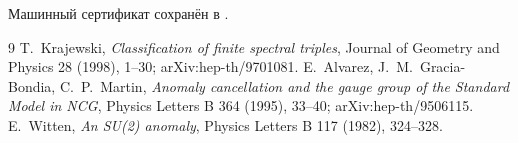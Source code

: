 Машинный сертификат сохранён в
.

\begin{thebibliography}{9}
T.~Krajewski,
\emph{Classification of finite spectral triples},
Journal of Geometry and Physics 28 (1998), 1--30; arXiv:hep-th/9701081.
E.~Alvarez, J.~M.~Gracia-Bondia, C.~P.~Martin,
\emph{Anomaly cancellation and the gauge group of the Standard Model in NCG},
Physics Letters B 364 (1995), 33--40; arXiv:hep-th/9506115.
E.~Witten,
\emph{An SU(2) anomaly},
Physics Letters B 117 (1982), 324--328.
\end{thebibliography}